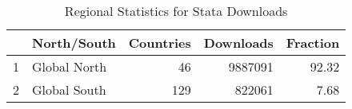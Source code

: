 \begin{table}[ht]
\centering
\begin{tabular}{rlrrr}
  \hline
 & North/South & Countries & Downloads & Fraction \\ 
  \hline
1 & Global North &  46 & 9887091 & 92.32 \\ 
  2 & Global South & 129 & 822061 & 7.68 \\ 
   \hline
\end{tabular}
\caption{Regional Statistics for Stata Downloads} 
\label{tab:stata_downloads_global_stats_select}
\end{table}
